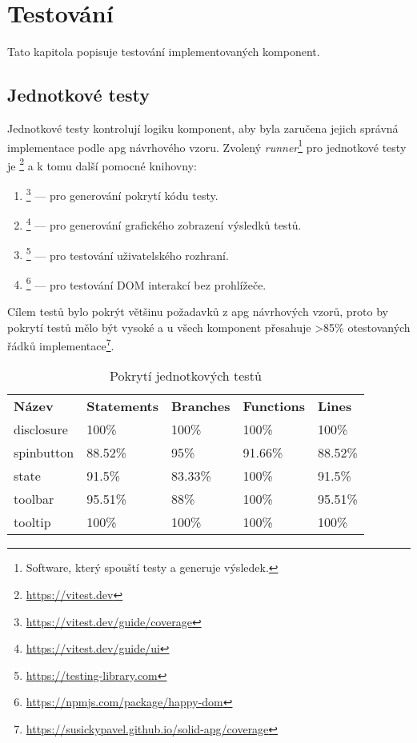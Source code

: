 \chapter{Testování}

Tato kapitola popisuje testování implementovaných komponent.

\section{Jednotkové testy}

Jednotkové testy kontrolují logiku komponent, aby byla zaručena jejich správná implementace podle \gls{apg} návrhového vzoru.
Zvolený \textit{runner}\footnote{Software, který spouští testy a generuje výsledek.} pro jednotkové testy je \footnote{\url{https://vitest.dev}} a k tomu další pomocné knihovny:

\begin{enumerate}
    \item {}\footnote{\url{https://vitest.dev/guide/coverage}} --- pro generování pokrytí kódu testy.
    \item {}\footnote{\url{https://vitest.dev/guide/ui}} --- pro generování grafického zobrazení výsledků testů.
    \item {}\footnote{\url{https://testing-library.com}} --- pro testování uživatelského rozhraní.
    \item {}\footnote{\url{https://npmjs.com/package/happy-dom}} --- pro testování DOM interakcí bez prohlížeče.
\end{enumerate}

Cílem testů bylo pokrýt většinu požadavků z \gls{apg} návrhových vzorů, proto by pokrytí testů mělo být vysoké a u všech komponent přesahuje >85\% otestovaných řádků implementace\footnote{\url{https://susickypavel.github.io/solid-apg/coverage}}.

\begin{table}[ht]
    \begin{ctucolortab}
        \begin{tabularx}{\textwidth}{Y Y Y Y Y}
            \bfseries Název & \bfseries Statements & \bfseries Branches & \bfseries Functions & \bfseries Lines \\\Midrule{}
            disclosure      & 100\%                & 100\%              & 100\%               & 100\%           \\
            spinbutton      & 88.52\%              & 95\%               & 91.66\%             & 88.52\%         \\
            state           & 91.5\%               & 83.33\%            & 100\%               & 91.5\%          \\
            toolbar         & 95.51\%              & 88\%               & 100\%               & 95.51\%         \\
            tooltip         & 100\%                & 100\%              & 100\%               & 100\%
        \end{tabularx}
    \end{ctucolortab}
    \caption{Pokrytí jednotkových testů}
\end{table}


